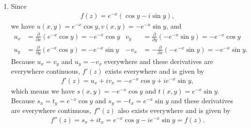 \documentclass[a4paper,12pt]{article}
\begin{document}
\begin{enumerate}
\begin{enumerate}
            \item
                Since
                \begin{align*}
                    f(z) = e^{-x}(\cos y - i \sin y),
                \end{align*}
                we have $u(x, y) = e^{-x} \cos y, v(x, y) = -e^{-x} \sin y$, and
                \begin{align*}
                    u_x &= \frac{\partial}{\partial x}(e^{-x} \cos y) = -e^{-x} \cos y &
                    v_y &= \frac{\partial}{\partial y}(-e^{-x} \sin y) = -e^{-x} \cos y \\
                    u_y &= \frac{\partial}{\partial y}(e^{-x} \cos y) = -e^{-x} \sin y &
                    -v_x &= -\frac{\partial}{\partial x}(-e^{-x} \sin y) = -e^{-x} \sin y.
                \end{align*}
                Because $u_x = v_y$ and $u_y = -v_x$ everywhere and these derivatives are everywhere continuous, $f'(z)$ exists everywhere and is given by
                \begin{align*}
                    f'(z) = u_x + iv_x = -e^{-x} \cos y + i e^{-x} \sin y,
                \end{align*}
                which means we have $s(x, y) = -e^{-x} \cos y$ and $t(x, y) = e^{-x} \sin y$. Because $s_x = t_y = e^{-x} \cos y$ and $s_y = -t_x = e^{-x} \sin y$ and these derivatives are everywhere continuous, $f''(z)$ also exists everywhere and is given by
                \begin{align*}
                    f''(z) = s_x + it_x = e^{-x} \cos y - i e^{-x} \sin y = f(z).
                \end{align*}


\end{enumerate}
\end{enumerate}
\end{document}
